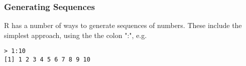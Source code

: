 
\begin{frame}
\frametitle{Generating Sequences }
R has a number of ways to generate sequences of numbers. 
These include the simplest approach, using the the colon ":", e.g.


\begin{framed}
\begin{verbatim}
> 1:10
[1] 1 2 3 4 5 6 7 8 9 10
\end{verbatim}
\end{framed}

\end{frame}


